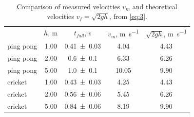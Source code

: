 \begin{table}
  \caption{Comparison of measured velocities $v_m$ and theoretical velocities $v_f=\sqrt{2gh}$, from \cref{eq:3}.}
  \label{tab:2}
  \begin{ruledtabular}
    \begin{tabular}{lcccc}
      & $h$, \unit{\meter} & $t_{fall}$, \unit{\second} & $v_m$, \unit{\meter\per\second} & $\sqrt{2gh}$, \unit{\meter\per\second} \\
      \colrule
      ping pong & \num{1.00} & \num{0.41\pm0.03} & \num{4.04} & \num{4.43} \\
      ping pong & \num{2.00} & \num{0.6\pm0.1} & \num{6.33} & \num{6.26} \\
      ping pong & \num{5.00} & \num{1.0\pm0.1} & \num{10.05} & \num{9.90} \\
      cricket & \num{1.00} & \num{0.43\pm0.03} & \num{4.25} & \num{4.43} \\
      cricket & \num{2.00} & \num{0.56\pm0.06} & \num{5.45} & \num{6.26} \\
      cricket & \num{5.00} & \num{0.84\pm0.06} & \num{8.19} & \num{9.90} 
    \end{tabular}
  \end{ruledtabular}
\end{table}
